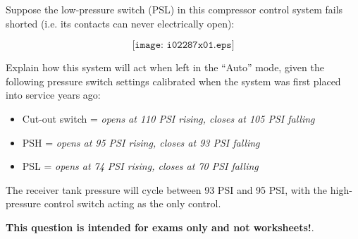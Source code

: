 

Suppose the low-pressure switch (PSL) in this compressor control system fails shorted (i.e. its contacts can never electrically open):

$$\texttt{[image: i02287x01.eps]}$$

Explain how this system will act when left in the ``Auto'' mode, given the following pressure switch settings calibrated when the system was first placed into service years ago:

\begin{itemize}
\item{} Cut-out switch = {\it opens at 110 PSI rising, closes at 105 PSI falling}
\vskip 10pt
\item{} PSH = {\it opens at 95 PSI rising, closes at 93 PSI falling}
\vskip 10pt
\item{} PSL = {\it opens at 74 PSI rising, closes at 70 PSI falling}
\end{itemize}







The receiver tank pressure will cycle between 93 PSI and 95 PSI, with the high-pressure control switch acting as the only control.







{\bf This question is intended for exams only and not worksheets!}.


